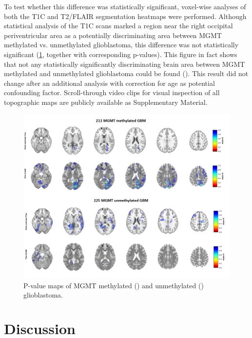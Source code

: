 To test whether this difference was statistically significant, voxel-wise analyses of both the \gls{T1C} and \gls{T2}/\gls{FLAIR} segmentation heatmaps were performed.
Although statistical analysis of the \gls{T1C} scans marked a region near the right occipital periventricular area as a potentially discriminating area between \gls{MGMT} methylated vs. unmethylated glioblastoma, this difference was not statistically significant (\cref{fig:HGG_location_pvalue_map}, together with corresponding p-values).
This figure in fact shows that not any statistically significantly discriminating brain area between \gls{MGMT} methylated and unmethylated glioblastoma could be found ().
This result did not change after an additional analysis with correction for age as potential confounding factor.
Scroll-through video clips for visual inspection of all topographic maps are publicly available as Supplementary Material.


\begin{figure}
    \centering
    \includegraphics[width=\textwidth]{Figures/Pvalue_map.png}

    \caption{P-value maps of \acrshort{MGMT} methylated () and unmethylated () glioblastoma.}\label{fig:HGG_location_pvalue_map}
\end{figure}

\section{Discussion}

